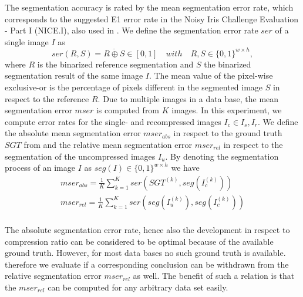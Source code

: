 \documentclass[10pt,twocolumn,letterpaper]{article}
\begin{document}
The segmentation accuracy is rated by the mean segmentation error rate, which corresponds to the suggested E1 error rate in the Noisy Iris Challenge Evaluation - Part I (NICE.I), also used in \cite{severeCompression}. We define the segmentation error rate $ser$ of a single image $I$ as
\begin{equation}
ser(R,S) = \overline{R \oplus S} \in [0,1]\quad with \quad R,S \in \{0,1\}^{w \times h},
\end{equation} where $R$ is the binarized reference segmentation and $S$ the binarized segmentation result of the same image $I$. The mean value of the pixel-wise exclusive-or is the percentage of pixels different in the segmented image $S$ in respect to the reference $R$. Due to multiple images in a data base, the mean segmentation error $mser$ is computed from $K$ images. In this experiment, we compute error rates for the single- and recompressed images $I_c \in {I_s, I_r}$. We define the absolute mean segmentation error $mser_{abs}$ in respect to the ground truth $SGT$ from \cite{severeCompression} and the relative mean segmentation error $mser_{rel}$ in respect to the segmentation of the uncompressed images $I_u$. By denoting the segmentation process of an image $I$ as $seg(I) \in \{0,1\}^{w \times h}$ we have
\begin{eqnarray}
mser_{abs} = \frac{1}{K}\sum_{k=1}^{K}ser(SGT^{(k)},seg(I_c^{(k)})) \label{equ:mserabs} \\
mser_{rel} = \frac{1}{K}\sum_{k=1}^{K}ser(seg(I_u^{(k)}),seg(I_c^{(k)})) \label{equ:mserrel} \\
\end{eqnarray}

The absolute segmentation error rate, hence also the development in respect to compression ratio can be considered to be optimal because of the available ground truth. However, for most data bases no such ground truth is available. therefore we evaluate if a corresponding conclusion can be withdrawn from the relative segmentation error $mser_{rel}$ as well. The benefit of such a relation is that the $mser_{rel}$ can be computed for any arbitrary data set easily. 
\end{document}
